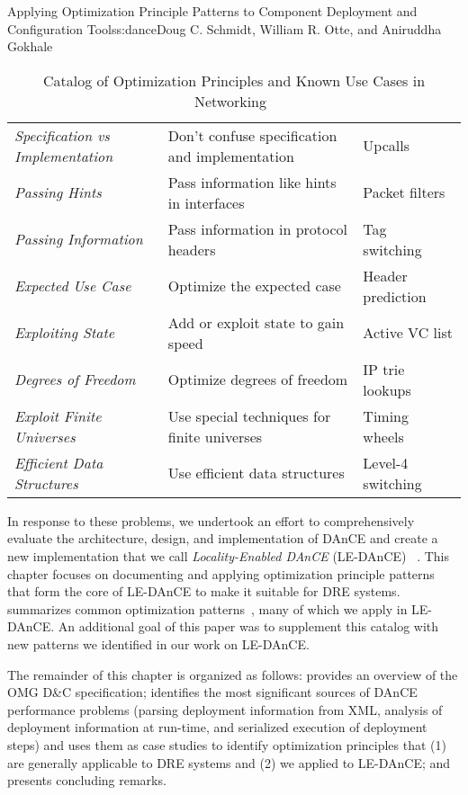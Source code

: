 \begin{aosachapter}{Applying Optimization Principle Patterns to Component Deployment and
                    Configuration Tools}{s:dance}{Doug C. Schmidt, William R. Otte, and Aniruddha Gokhale}
\begin{table}
{\begin{tabular}{ p{3.5cm} p{5.0cm} p{4.0cm} }
\textit{Specification vs Implementation}
& Don't confuse specification and implementation
& Upcalls~\cite{Hutchinson:88}
\\ 
\textit{Passing Hints}
& Pass information like hints in interfaces
& Packet filters~\cite{Jacobson:93,Rashid:87f,Engler:96}
\\ 
\textit{Passing Information}
& Pass information in protocol headers
& Tag switching~\cite{Rekhter:97}
\\
\textit{Expected Use Case}
& Optimize the expected case
& Header prediction~\cite{Clark:89}
\\ 
\textit{Exploiting State}
& Add or exploit state to gain speed
& Active VC list
\\ 
\textit{Degrees of Freedom}
& Optimize degrees of freedom
& IP trie lookups~\cite{Sahni:03}
\\ 
\textit{Exploit Finite Universes}
& Use special techniques for finite universes
& Timing wheels~\cite{Varghese:97}
\\ 
\textit{Efficient Data Structures}
& Use efficient data structures
& Level-4 switching
\\ 
\hline
\end{tabular}
\caption{Catalog of Optimization Principles and Known Use Cases in Networking~\cite{Varghesebook:05}}
\label{tbl.principles}
}
\end{table}

In response to these problems, we undertook an effort to comprehensively
evaluate the architecture, design, and implementation of DAnCE and
create a new implementation that we call \emph{Locality-Enabled DAnCE}
(LE-DAnCE)~\cite{Schmidt:11a} \cite{SchmidtDnCIST:13}. This chapter
focuses on documenting and applying optimization principle patterns that
form the core of LE-DAnCE to make it suitable for DRE systems.
 summarizes common optimization
patterns~\cite{Varghesebook:05}, many of which we apply in LE-DAnCE. An
additional goal of this paper was to supplement this catalog with new
patterns we identified in our work on LE-DAnCE.

The remainder of this chapter is organized as follows:
 provides an overview of the OMG D\&C
specification;  identifies the most significant
sources of DAnCE performance problems (parsing deployment information
from XML, analysis of deployment information at run-time, and serialized
execution of deployment steps) and uses them as case studies to identify
optimization principles that (1) are generally applicable to DRE systems
and (2) we applied to LE-DAnCE; and  presents
concluding remarks.


\end{aosachapter}
